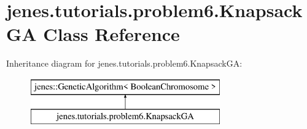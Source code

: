 \hypertarget{classjenes_1_1tutorials_1_1problem6_1_1_knapsack_g_a}{\section{jenes.\-tutorials.\-problem6.\-Knapsack\-G\-A Class Reference}
\label{classjenes_1_1tutorials_1_1problem6_1_1_knapsack_g_a}
}
Inheritance diagram for jenes.\-tutorials.\-problem6.\-Knapsack\-G\-A\-:\begin{figure}[H]
\begin{center}
\leavevmode
\includegraphics[height=2.000000cm]{classjenes_1_1tutorials_1_1problem6_1_1_knapsack_g_a}
\end{center}
\end{figure}
